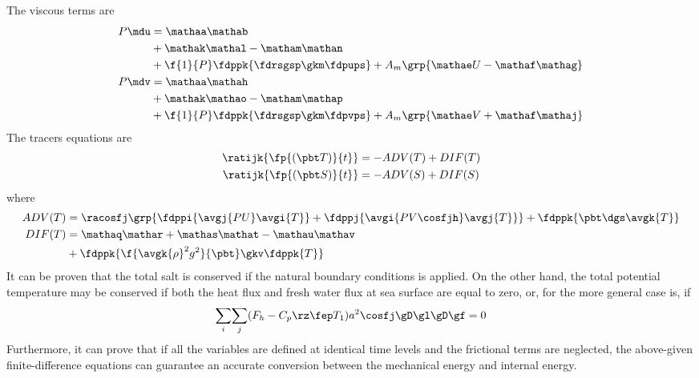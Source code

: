The viscous terms are
\bese \label{eq:42}
\begin{align}
  P\mdu &= \mathaa\mathab \notag\\
        &+\mathak\mathal - \matham\mathan\notag\\
        &+ \f{1}{P}\fdppk{\fdrsgsp \gkm\fdpups} 
        + A_m \grp{ \mathae U - \mathaf\mathag } \\
  P\mdv &= \mathaa\mathah \notag\\
        &+\mathak\mathao - \matham\mathap\notag\\
        &+\f{1}{P}\fdppk{\fdrsgsp \gkm\fdpvps}
        + A_m \grp{ \mathae V + \mathaf\mathaj }
\end{align}
\ense
The tracers equations are
\bese
\begin{align}
  \ratijk{\fp{(\pbt T)}{t}} &=-ADV(T)+DIF(T)\\
  \ratijk{\fp{(\pbt S)}{t}} &=-ADV(S)+DIF(S)
\end{align}
\ense
where
\begin{align} \label{eq:41}
  ADV(T) &= \racosfj \grp{ \fdppi{\avgj{PU}\avgi{T}} +
  \fdppj{\avgi{PV\cosfjh}\avgj{T}} } + \fdppk{\pbt \dgs\avgk{T}}\\
  DIF(T) &= \mathaq\mathar + \mathas\mathat - \mathau\mathav \notag\\
         &+\fdppk{\f{{\avgk{\rho}}^2 g^2}{\pbt}\gkv\fdppk{T}}
\end{align}
 It can be proven that the total salt is conserved if the natural
boundary conditions is applied. On the other hand, the total potential
temperature may be conserved if both the heat flux and fresh water
flux at sea surface are equal to zero, or, for the more general case
is, if
\begin{equation}
\underset{i}{\sum}\underset{j}{\sum}(F_h-C_p\rz \fep T_1)a^2\cosfj\gD\gl\gD\gf=0
\end{equation}
 Furthermore, it can prove that if all the variables are defined at
identical time levels and the frictional terms are neglected, the
above-given finite-difference equations can guarantee an accurate
conversion between the mechanical energy and internal energy.
